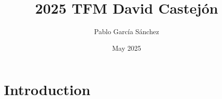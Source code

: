 \documentclass{article}
\title{2025 TFM David Castejón}
\author{Pablo García Sánchez}
\date{May 2025}
\begin{document}
\maketitle

\section{Introduction}
\end{document}

